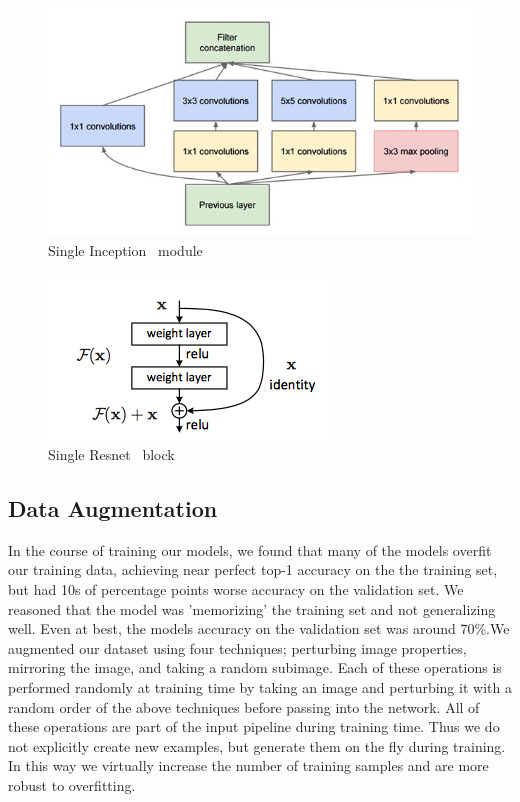 \begin{figure}[b]
\centering
\includegraphics[width=\columnwidth]{figures/inception_module}
\caption{Single Inception~\cite{inception} module}
\label{fig:inception-module}
\end{figure}

\begin{figure}[b]
\centering
\includegraphics[width=\columnwidth]{figures/residual_block}
\caption{Single Resnet~\cite{resnet} block}
\label{fig:resnet-block}
\end{figure}

\subsection{Data Augmentation}
In the course of training our models, we found that many of the models overfit our training data, achieving near perfect top-1 accuracy on the the training set, but had 10s of percentage points worse accuracy on the validation set. We reasoned that the model was 'memorizing' the training set and not generalizing well. Even at best, the models accuracy on the validation set was around 70\%.We augmented our dataset using four techniques; perturbing image properties, mirroring the image, and taking a random subimage. Each of these operations is performed randomly at training time by taking an image and perturbing it with a random order of the above techniques before passing into the network. All of these operations are part of the input pipeline during training time. Thus we do not explicitly create new examples, but generate them on the fly during training. In this way we virtually increase the number of training samples and are more robust to overfitting. 

